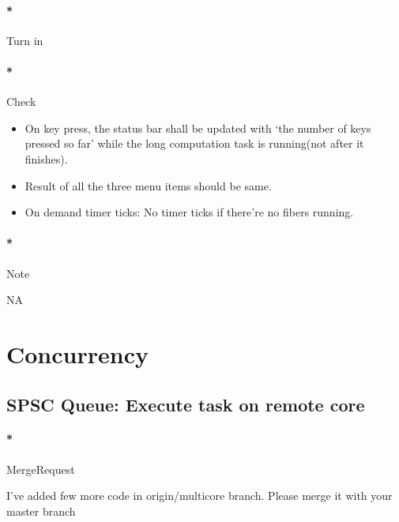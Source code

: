 \documentclass[]{article}
\newenvironment{Shaded}{}{}
\newcommand{\ExtensionTok}[1]{{#1}}
\newcommand{\NormalTok}[1]{{#1}}
\providecommand{\tightlist}{%
  \setlength{\itemsep}{0pt}\setlength{\parskip}{0pt}}
\let\oldparagraph\paragraph
\renewcommand{\paragraph}[1]{\oldparagraph{#1}\mbox{}}
\begin{document}
\paragraph*{Turn in}\label{turn-in-7}

\paragraph*{Check}\label{check-7}

\begin{itemize}
\tightlist
\item
  On key press, the status bar shall be updated with `the number of keys
  pressed so far' while the long computation task is running(not after
  it finishes).
\item
  Result of all the three menu items should be same.
\item
  On demand timer ticks: No timer ticks if there're no fibers running.
\end{itemize}

\paragraph*{Note}\label{note-9}

NA

\section{Concurrency}\label{concurrency}

\subsection{SPSC Queue: Execute task on remote
core}\label{spsc-queue-execute-task-on-remote-core}

\paragraph*{MergeRequest}\label{mergerequest-8}

I've added few more code in origin/multicore branch. Please merge it
with your master branch

\begin{Shaded}
\end{Shaded}
\end{document}
